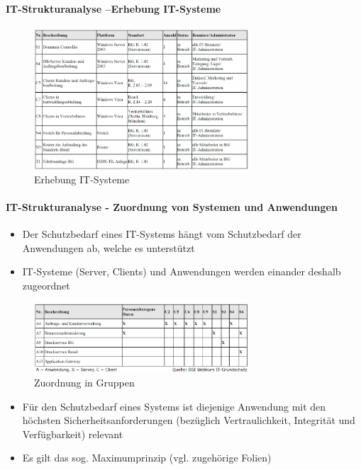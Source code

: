 \documentclass[10pt,a4paper]{article}
\begin{document}
\paragraph*{IT-Strukturanalyse –Erhebung IT-Systeme}
\begin{figure}[H]
    \begin{center}
    \includegraphics[width=8cm]{images/Erhebung IT-Systeme.png}
    \caption{Erhebung IT-Systeme}
    \label{Erhebung IT-Systeme}
    \end{center}
\end{figure}

\paragraph*{IT-Strukturanalyse - Zuordnung von Systemen und Anwendungen}
\begin{itemize}[noitemsep,topsep=0pt,leftmargin=*]
    \item Der Schutzbedarf eines IT-Systems hängt vom
    Schutzbedarf der Anwendungen ab, welche es
    unterstützt
    \item IT-Systeme (Server, Clients) und Anwendungen
    werden einander deshalb zugeordnet
\end{itemize}
\begin{figure}[H]
    \begin{center}
    \includegraphics[width=8cm]{images/Zuordnung_Sys_App.png}
    \caption{Zuordnung in Gruppen}
    \label{Zuordnung in Gruppen}
    \end{center}
\end{figure}

\begin{itemize}[noitemsep,topsep=0pt,leftmargin=*]
    \item Für den Schutzbedarf eines Systems ist diejenige
    Anwendung mit den höchsten
    Sicherheitsanforderungen (bezüglich Vertraulichkeit,
    Integrität und Verfügbarkeit) relevant
    \item Es gilt das sog. Maximumprinzip (vgl. zugehörige
    Folien)
\end{itemize}
\end{document}
